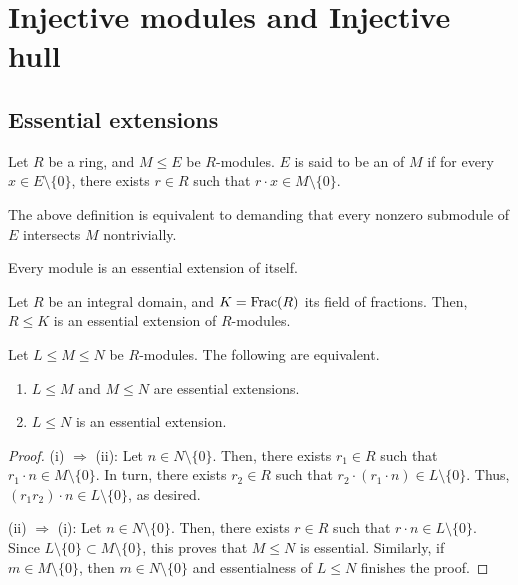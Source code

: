 \section{Injective modules and Injective hull}

\subsection{Essential extensions}

\begin{defn}
	Let $R$ be a ring, and $M \le E$ be $R$-modules. $E$ is said to be an  of $M$ if for every $x \in E \setminus \{0\}$, there exists $r \in R$ such that $r \cdot x \in M \setminus \{0\}$.
\end{defn}

\begin{rem} \label{rem:equivalent-injective}
	The above definition is equivalent to demanding that every nonzero submodule of $E$ intersects $M$ nontrivially.
\end{rem}

\begin{ex}
	Every module is an essential extension of itself.
\end{ex}

\begin{ex}
	Let $R$ be an integral domain, and $K = \operatorname{Frac}(R)$ its field of fractions. Then, $R \le K$ is an essential extension of $R$-modules.
\end{ex}

\begin{prop} \label{prop:transitivity-of-essentialness}
	Let $L \le M \le N$ be $R$-modules. The following are equivalent.
	\begin{enumerate}[label=(\roman*)]
		\item $L \le M$ and $M \le N$ are essential extensions.
		\item $L \le N$ is an essential extension.
	\end{enumerate}
\end{prop}
\begin{proof} 
	(i) $\Rightarrow$ (ii): Let $n \in N \setminus \{0\}$. Then, there exists $r_{1} \in R$ such that $r_{1} \cdot n \in M \setminus \{0\}$. In turn, there exists $r_{2} \in R$ such that $r_{2} \cdot (r_{1} \cdot n) \in L \setminus \{0\}$. Thus, $(r_{1} r_{2}) \cdot n \in L \setminus \{0\}$, as desired.

	(ii) $\Rightarrow$ (i): Let $n \in N \setminus \{0\}$. Then, there exists $r \in R$ such that $r \cdot n \in L \setminus \{0\}$. Since $L \setminus \{0\} \subset M \setminus \{0\}$, this proves that $M \le N$ is essential. \newline
	Similarly, if $m \in M \setminus \{0\}$, then $m \in N \setminus \{0\}$ and essentialness of $L \le N$ finishes the proof.
\end{proof}

